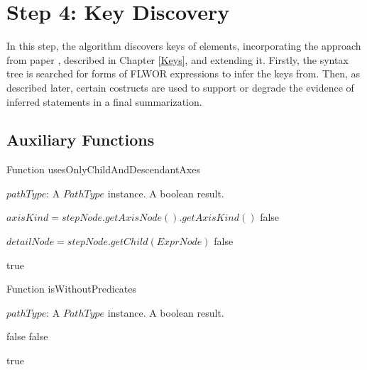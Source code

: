 
\section{Step 4: Key Discovery}
In this step, the algorithm discovers keys of elements, incorporating the approach from paper \cite{Necasky:2009:DXK:1529282.1529414}, described in Chapter \ref{Keys}, and extending it. Firstly, the syntax tree is searched for forms of FLWOR expressions to infer the keys from. Then, as described later, certain costructs are used to support or degrade the evidence of inferred statements in a final summarization.

\subsection{Auxiliary Functions}

\begin{algorithm}
\caption{Function usesOnlyChildAndDescendantAxes}
\label{ALG_function_uses_only_child_and_descendant_axes}
\begin{algorithmic}[1]
\REQUIRE $pathType$: A $PathType$ instance.
\ENSURE A boolean result.

		\STATE $axisKind = stepNode.getAxisNode().getAxisKind()$
			\RETURN false
		\ENDIF
	\ENDIF
\ENDFOR

\STATE $detailNode = stepNode.getChild(ExprNode)$
			\RETURN false
		\ENDIF
	\ENDIF
\ENDIF

\RETURN true
\end{algorithmic}
\end{algorithm}

\begin{algorithm}
\caption{Function isWithoutPredicates}
\label{ALG_function_is_without_predicates}
\begin{algorithmic}[1]
\REQUIRE $pathType$: A $PathType$ instance.
\ENSURE A boolean result.

		\RETURN false
	\ENDIF
			\RETURN false
		\ENDIF
	\ENDIF
\ENDFOR

\RETURN true
\end{algorithmic}
\end{algorithm}

